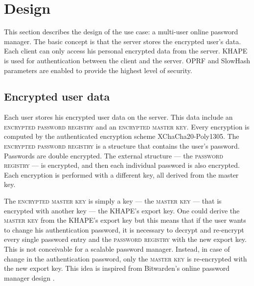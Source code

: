 \documentclass[../report.tex]{subfiles}
\begin{document}


\section{Design}
This section describes the design of the use case: a multi-user online password manager.
The basic concept is that the server stores the encrypted user's data. 
Each client can only access his personal encrypted data from the server.
KHAPE is used for authentication between the client and the server. OPRF and SlowHash parameters are enabled to provide the highest level of security.



\subsection{Encrypted user data}
Each user stores his encrypted user data on the server. This data include an \textsc{encrypted password registry} and an \textsc{encrypted master key}. Every encryption is computed by the authenticated encryption scheme XChaCha20-Poly1305.
The \textsc{encrypted password registry} is a structure that contains the user's password. Passwords are double encrypted. The external structure --- the \textsc{password registry} --- is encrypted, and then each individual password is also encrypted. Each encryption is performed with a different key, all derived from the master key.

The \textsc{encrypted master key} is simply a key --- the \textsc{master key} --- that is encrypted with another key --- the KHAPE's export key. 
One could derive the \textsc{master key} from the KHAPE's export key but this means that if the user wants to change his authentication password, it is necessary to decrypt and re-encrypt every single password entry and the \textsc{password registry} with the new export key. This is not conceivable for a scalable password manager. Instead, in case of change in the authentication password, only the \textsc{master key} is re-encrypted with the new export key. This idea is inspired from Bitwarden's online password manager design \cite{Bitwarden_Paper}.

% 
% 
% 
% 
\end{document}
